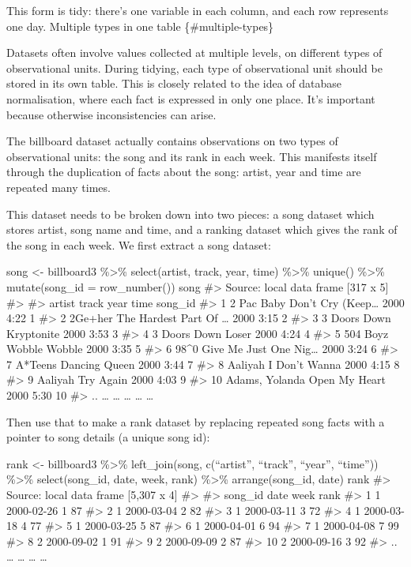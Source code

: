 \documentclass[]{article}
\begin{document}
This form is tidy: there's one variable in each column, and each row
represents one day. Multiple types in one table \{\#multiple-types\}

Datasets often involve values collected at multiple levels, on different
types of observational units. During tidying, each type of observational
unit should be stored in its own table. This is closely related to the
idea of database normalisation, where each fact is expressed in only one
place. It's important because otherwise inconsistencies can arise.

The billboard dataset actually contains observations on two types of
observational units: the song and its rank in each week. This manifests
itself through the duplication of facts about the song: artist, year and
time are repeated many times.

This dataset needs to be broken down into two pieces: a song dataset
which stores artist, song name and time, and a ranking dataset which
gives the rank of the song in each week. We first extract a song
dataset:

song \textless{}- billboard3 \%\textgreater{}\% select(artist, track,
year, time) \%\textgreater{}\% unique() \%\textgreater{}\%
mutate(song\_id = row\_number()) song \#\textgreater{} Source: local
data frame {[}317 x 5{]} \#\textgreater{} \#\textgreater{} artist track
year time song\_id \#\textgreater{} 1 2 Pac Baby Don't Cry (Keep\ldots{}
2000 4:22 1 \#\textgreater{} 2 2Ge+her The Hardest Part Of \ldots{} 2000
3:15 2 \#\textgreater{} 3 3 Doors Down Kryptonite 2000 3:53 3
\#\textgreater{} 4 3 Doors Down Loser 2000 4:24 4 \#\textgreater{} 5 504
Boyz Wobble Wobble 2000 3:35 5 \#\textgreater{} 6 98\^{}0 Give Me Just
One Nig\ldots{} 2000 3:24 6 \#\textgreater{} 7 A*Teens Dancing Queen
2000 3:44 7 \#\textgreater{} 8 Aaliyah I Don't Wanna 2000 4:15 8
\#\textgreater{} 9 Aaliyah Try Again 2000 4:03 9 \#\textgreater{} 10
Adams, Yolanda Open My Heart 2000 5:30 10 \#\textgreater{} .. \ldots{}
\ldots{} \ldots{} \ldots{} \ldots{}

Then use that to make a rank dataset by replacing repeated song facts
with a pointer to song details (a unique song id):

rank \textless{}- billboard3 \%\textgreater{}\% left\_join(song,
c(``artist'', ``track'', ``year'', ``time'')) \%\textgreater{}\%
select(song\_id, date, week, rank) \%\textgreater{}\% arrange(song\_id,
date) rank \#\textgreater{} Source: local data frame {[}5,307 x 4{]}
\#\textgreater{} \#\textgreater{} song\_id date week rank
\#\textgreater{} 1 1 2000-02-26 1 87 \#\textgreater{} 2 1 2000-03-04 2
82 \#\textgreater{} 3 1 2000-03-11 3 72 \#\textgreater{} 4 1 2000-03-18
4 77 \#\textgreater{} 5 1 2000-03-25 5 87 \#\textgreater{} 6 1
2000-04-01 6 94 \#\textgreater{} 7 1 2000-04-08 7 99 \#\textgreater{} 8
2 2000-09-02 1 91 \#\textgreater{} 9 2 2000-09-09 2 87 \#\textgreater{}
10 2 2000-09-16 3 92 \#\textgreater{} .. \ldots{} \ldots{} \ldots{}
\ldots{}
\end{document}
